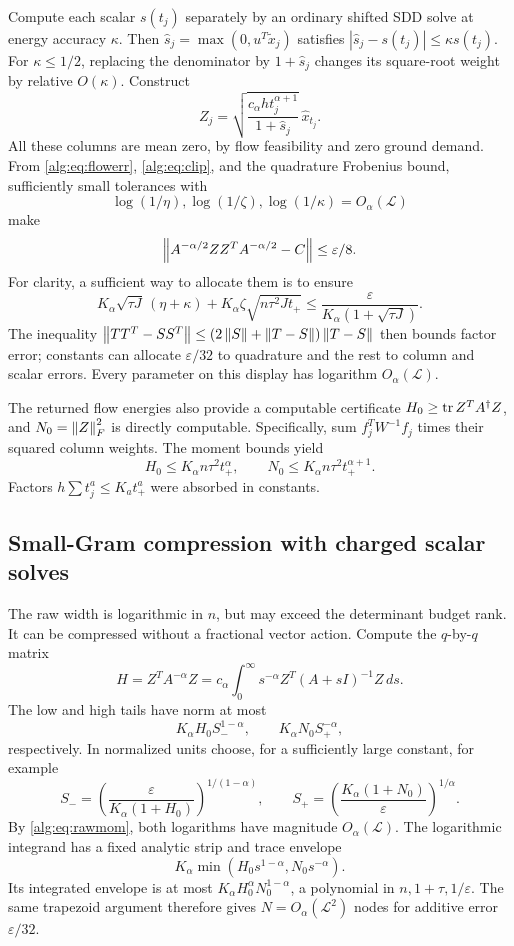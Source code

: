 Compute each scalar $s(t_j)$ separately by an ordinary shifted SDD
solve at energy accuracy $\kappa$. Then
$\widehat s_j=\max(0,u^T\widetilde x_j)$ satisfies
$|\widehat s_j-s(t_j)|\le\kappa s(t_j)$.
For $\kappa\le1/2$, replacing the denominator by $1+\widehat s_j$
changes its square-root weight by relative $O(\kappa)$.
Construct
\[
 Z_j=\sqrt{\frac{c_\alpha h t_j^{\alpha+1}}{1+\widehat s_j}}
         \,\widehat x_{t_j}.
\]
All these columns are mean zero, by flow feasibility and zero ground
demand. From \eqref{alg:eq:flowerr}, \eqref{alg:eq:clip}, and the quadrature
Frobenius bound, sufficiently small tolerances with
\[
 \log(1/\eta),\log(1/\zeta),\log(1/\kappa)
       =O_\alpha(\mathcal L)
\]
make
\begin{equation}\label{alg:eq:raw}
 \left\lVert A^{-\alpha/2}ZZ^TA^{-\alpha/2}-C\right\rVert\le\varepsilon/8.
\end{equation}
For clarity, a sufficient way to allocate them is to ensure
\[
 K_\alpha\sqrt{\tau J}\,(\eta+\kappa)
 +K_\alpha\zeta\sqrt{n\tau^2Jt_+}
 \le \frac{\varepsilon}{K_\alpha(1+\sqrt{\tau J})}.
\]
The inequality $\left\lVert TT^T-SS^T\right\rVert\le
(2\left\lVert S\right\rVert+\left\lVert T-S\right\rVert)\left\lVert T-S\right\rVert$ then bounds factor error;
constants can allocate $\varepsilon/32$ to quadrature and the rest to
column and scalar errors. Every parameter on this display has
logarithm $O_\alpha(\mathcal L)$.

The returned flow energies also provide a computable certificate
$H_0\ge\operatorname{tr} Z^TA^\dagger Z$, and $N_0=\left\lVert Z\right\rVert_F^2$ is directly
computable. Specifically, sum $f_j^TW^{-1}f_j$ times their squared
column weights. The moment bounds yield
\begin{equation}\label{alg:eq:rawmom}
 H_0\le K_\alpha n\tau^2t_+^\alpha,
 \qquad N_0\le K_\alpha n\tau^2t_+^{\alpha+1}.
\end{equation}
Factors $h\sum t_j^a\le K_a t_+^a$ were absorbed in constants.

\subsection{Small-Gram compression with charged scalar solves}
The raw width is logarithmic in $n$, but may exceed the determinant
budget rank. It can be compressed without a fractional vector action.
Compute the $q$-by-$q$ matrix
\begin{equation}\label{alg:eq:gram}
 H=Z^TA^{-\alpha}Z
   =c_\alpha\int_0^\infty s^{-\alpha}Z^T(A+sI)^{-1}Z\,ds.
\end{equation}
The low and high tails have norm at most
\[
 K_\alpha H_0 S_-^{1-\alpha},\qquad
 K_\alpha N_0 S_+^{-\alpha},
\]
respectively. In normalized units choose, for a sufficiently large
constant, for example
\[
 S_- =\left(\frac{\varepsilon}{K_\alpha(1+H_0)}\right)^{1/(1-\alpha)},
 \qquad
 S_+ =\left(\frac{K_\alpha(1+N_0)}\varepsilon\right)^{1/\alpha}.
\]
By \eqref{alg:eq:rawmom}, both logarithms have magnitude
$O_\alpha(\mathcal L)$.
The logarithmic integrand has a fixed analytic strip and trace envelope
\[
 K_\alpha\min(H_0s^{1-\alpha},N_0s^{-\alpha}).
\]
Its integrated envelope is at most
$K_\alpha H_0^\alpha N_0^{1-\alpha}$, a polynomial in
$n,1+\tau,1/\varepsilon$. The same trapezoid argument therefore
gives $N=O_\alpha(\mathcal L^2)$ nodes for additive error
$\varepsilon/32$.

